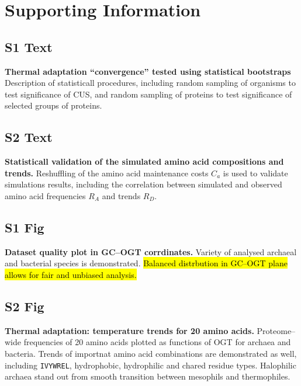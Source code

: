 \documentclass[10pt,letterpaper]{article}
\begin{document}



\section*{Supporting Information}

\subsection*{S1 Text}
\label{text:s1}
{\bf Thermal adaptation ``convergence'' tested using statistical bootstraps}
Description of statisticall procedures, including random sampling of organisms to test significance of CUS, and random sampling of proteins to test significance of selected groups of proteins.


\subsection*{S2 Text}
\label{text:s2}
{\bf Statisticall validation of the simulated amino acid compositions and trends.}
Reshuffling of the amino acid maintenance costs $C_{a}$ is used to validate simulations results, including the correlation between simulated and observed amino acid frequencies $R_A$ and trends $R_D$.



\subsection*{S1 Fig}
\label{fig:s1}
{\bf Dataset quality plot in GC--OGT corrdinates.}
Variety of analysed archaeal and bacterial species is demonstrated. \hl{Balanced distrbution in GC--OGT plane allows for fair and unbiased analysis.}


\subsection*{S2 Fig}
\label{fig:s2}
{\bf Thermal adaptation: temperature trends for 20 amino acids. }
Proteome--wide frequencies of 20 amino acids plotted as functions of OGT for archaea and bacteria. Trends of importnat amino acid combinations are demonstrated as well, including \texttt{IVYWREL}, hydrophobic, hydrophilic and chared residue types. Halophilic archaea stand out from smooth transition between mesophils and thermophiles.
\end{document}
